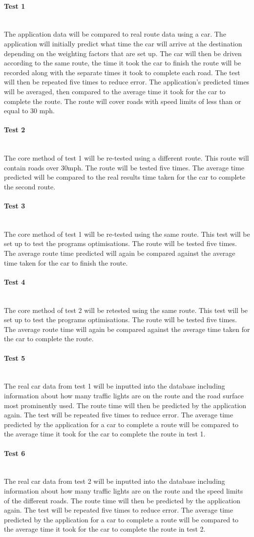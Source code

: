\documentclass[12pt,a4paper]{article}
\newcommand{\myparagraph}[1]{\paragraph{#1}\mbox{}\\}
\begin{document}
\myparagraph{Test 1}
The application data will be compared to real route data using a car. The application will initially predict what time the car will arrive at the destination depending on the weighting factors that are set up. The car will then be driven according to the same route, the time it took the car to finish the route will be recorded along with the separate times it took to complete each road. The test will then be repeated five times to reduce error. The application's predicted times will be averaged, then compared to the average time it took for the car to complete the route. The route will cover roads with speed limits of less than or equal to 30 mph.

\myparagraph{Test 2}
The core method of test 1 will be re-tested using a different route. This route will contain roads over 30mph. The route will be tested five times. The average time predicted will be compared to the real results time taken for the car to complete the second route.

\myparagraph{Test 3}
The core method of test 1 will be re-tested using the same route. This test will be set up to test the programs optimisations. The route will be tested five times. The average route time predicted will again be compared against the average time taken for the car to finish the route.

\myparagraph{Test 4}
The core method of test 2 will be retested using the same route. This test will be set up to test the programs optimisations. The route will be tested five times. The average route time will again be compared against the average time taken for the car to complete the route.  

\myparagraph{Test 5}
The real car data from test 1 will be inputted into the database including information about how many traffic lights are on the route and the road surface most prominently used. The route time will then be predicted by the application again. The test will be repeated five times to reduce error. The average time predicted by the application for a car to complete a route will be compared to the average time it took for the car to complete the route in test 1.

\myparagraph{Test 6}
The real car data from test 2 will be inputted into the database including information about how many traffic lights are on the route and the speed limits of the different roads. The route time will then be predicted by the application again. The test will be repeated five times to reduce error. The average time predicted by the application for a car to complete a route will be compared to the average time it took for the car to complete the route in test 2.
\end{document}
